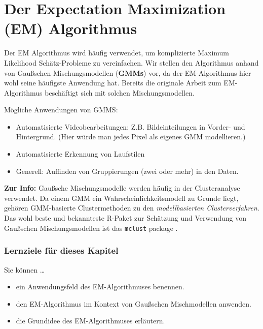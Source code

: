 \documentclass[
]{book}
\providecommand{\tightlist}{%
  \setlength{\itemsep}{0pt}\setlength{\parskip}{0pt}}
\begin{document}
\hypertarget{der-expectation-maximization-em-algorithmus}{%
\chapter{Der Expectation Maximization (EM) Algorithmus}\label{der-expectation-maximization-em-algorithmus}}

Der EM Algorithmus wird häufig verwendet, um komplizierte Maximum Likelihood Schätz-Probleme zu vereinfachen. Wir stellen den Algorithmus anhand von Gaußschen Mischungsmodellen (\textbf{GMMs}) vor, da der EM-Algorithmus hier wohl seine häufigste Anwendung hat. Bereits die originale Arbeit zum EM-Algorithmus \citep{Dempster_1977} beschäftigt sich mit solchen Mischungsmodellen.

Mögliche Anwendungen von GMMS:

\begin{itemize}
\tightlist
\item
  Automatisierte Videobearbeitungen: Z.B. Bildeinteilungen in Vorder- und Hintergrund. (Hier würde man jedes Pixel als eigenes GMM modellieren.)
\item
  Automatisierte Erkennung von Laufstilen \citep{Liebl2014}
\item
  Generell: Auffinden von Gruppierungen (zwei oder mehr) in den Daten.
\end{itemize}

\textbf{Zur Info:} Gaußsche Mischungsmodelle werden häufig in der Clusteranalyse verwendet. Da einem GMM ein Wahrscheinlichkeitsmodell zu Grunde liegt, gehören GMM-basierte Clustermethoden zu den \emph{modellbasierten Clusterverfahren}. Das wohl beste und bekannteste R-Paket zur Schätzung und Verwendung von Gaußschen Mischungsmodellen ist das \texttt{mclust} package \citep{mclust}.

\hypertarget{lernziele-fuxfcr-dieses-kapitel}{%
\subsection*{Lernziele für dieses Kapitel}\label{lernziele-fuxfcr-dieses-kapitel}}

Sie können \ldots{}

\begin{itemize}
\tightlist
\item
  ein Anwendungsfeld des EM-Algorithmuses benennen.
\item
  den EM-Algorithmus im Kontext von Gaußschen Mischmodellen anwenden.
\item
  die Grundidee des EM-Algorithmuses erläutern.
\end{itemize}
\end{document}
